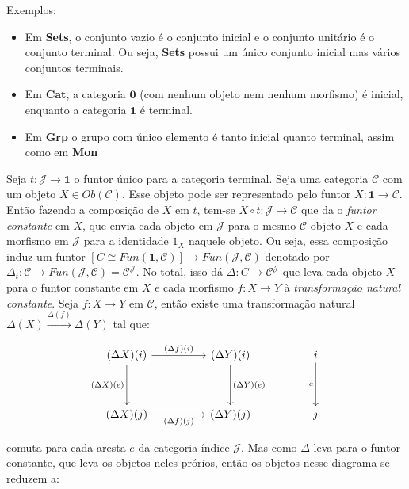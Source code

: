 \documentclass[../main.tex]{subfiles}
\begin{document}
Exemplos:

\begin{itemize}
    \item Em \textbf{Sets}, o conjunto vazio é o conjunto inicial e o conjunto unitário é o conjunto terminal. Ou seja, \textbf{Sets} possui um único conjunto inicial mas vários conjuntos terminais.
    \item Em \textbf{Cat}, a categoria $\textbf{0}$ (com nenhum objeto nem nenhum morfismo) é inicial, enquanto a categoria $\textbf{1}$ é terminal.
    \item Em \textbf{Grp} o grupo com único elemento é tanto inicial quanto terminal, assim como em \textbf{Mon}
\end{itemize}

Seja $t : \mathcal{J} \to \textbf{1}$ o funtor único para a categoria terminal. Seja uma categoria $\mathcal{C}$ com um objeto $X \in Ob(\mathcal{C})$. Esse objeto pode ser representado pelo funtor $X : \textbf{1} \to \mathcal{C}$. Então fazendo a composição de $X$ em $t$, tem-se $X \circ t : \mathcal{J} \to \mathcal{C}$ que da o \emph{funtor constante} em $X$, que envia cada objeto em $\mathcal{J}$ para o mesmo $\mathcal{C}$-objeto $X$ e cada morfismo em $\mathcal{J}$ para a identidade $1_X$ naquele objeto. Ou seja, essa composição induz um funtor $[C \cong Fun(\textbf{1}, \mathcal{C})] \to Fun(\mathcal{J}, \mathcal{C})$ denotado por $\Delta_t : \mathcal{C} \to Fun(\mathcal{J}, \mathcal{C}) = \mathcal{C}^{\mathcal{J}}$. No total, isso dá $\Delta : C \to \mathcal{C}^{\mathcal{J}}$ que leva cada objeto $X$ para o funtor constante em $X$ e cada morfismo $f : X \to Y$ à \emph{transformação natural constante}. Seja $f : X \to Y$ em $\mathcal{C}$, então existe uma transformação natural $\Delta (X) \xrightarrow{\Delta (f)} \Delta (Y)$ tal que:

\[\begin{tikzcd}
	{(\Delta X)(i)} && {(\Delta Y)(i)} && i \\
	\\
	{(\Delta X)(j)} && {(\Delta Y)(j)} && j
	\arrow["{(\Delta f)(i)}", from=1-1, to=1-3]
	\arrow["{(\Delta X)(e)}"', from=1-1, to=3-1]
	\arrow["{(\Delta Y)(e)}", from=1-3, to=3-3]
	\arrow["e"', from=1-5, to=3-5]
	\arrow["{(\Delta f)(j)}"', from=3-1, to=3-3]
\end{tikzcd}\]

comuta para cada aresta $e$ da categoria índice $\mathcal{J}$. Mas como $\Delta$ leva para o funtor constante, que leva os objetos neles prórios, então os objetos nesse diagrama se reduzem a:
\end{document}
